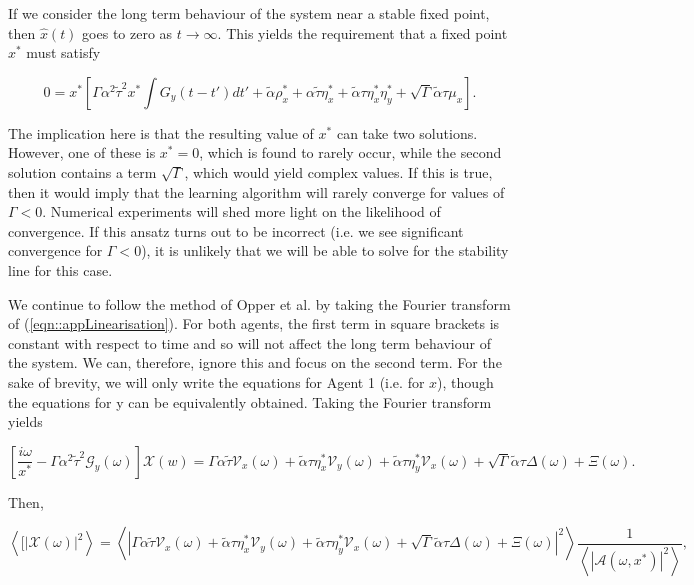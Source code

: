 \documentclass[.../main.tex]{subfiles}
\begin{document}
If we consider the long term behaviour of the system near a stable fixed point, then $\hat{x}(t)$ goes to zero as $t \rightarrow \infty$. This yields the requirement that a fixed point $x^*$ must satisfy


\begin{equation}
	0 = x^* \left[\Gamma \alpha^2 \tilde{\tau}^2 x^* \int G_y(t - t') dt' + \tilde{\alpha} \rho_x^* + \alpha \tilde{\tau} \eta_x^* + \tilde{\alpha} \tau \eta_x^* \eta_y^* + \sqrt{\Gamma} \tilde{\alpha} \tau \mu_x \right].
\end{equation}

The implication here is that the resulting value of $x^*$ can take two solutions. However, one of these is $x^* = 0$, which is found to rarely occur, while the second solution contains a term $\sqrt{\Gamma}$, which would yield complex values. If this is true, then it would imply that the learning algorithm will rarely converge for values of $\Gamma < 0$. Numerical experiments will shed more light on the likelihood of convergence. If this ansatz turns out to be incorrect (i.e. we see significant convergence for $\Gamma < 0$), it is unlikely that we will be able to solve for the stability line for this case.  

We continue to follow the method of Opper et al. by taking the Fourier transform of (\ref{eqn::appLinearisation}). For both agents, the first term in square brackets is constant with respect to time and so will not affect the long term behaviour of the system. We can, therefore, ignore this and focus on the second term. For the sake of brevity, we will only write the equations for Agent 1 (i.e. for $x$), though the equations for y can be equivalently obtained. Taking the Fourier transform yields

\begin{equation}
	\left[ \frac{i \omega}{x^*} - \Gamma \alpha^2 \tilde{\tau}^2 \mathcal{G}_y(\omega)\right] \mathcal{X}(w) = \Gamma \alpha \tilde{\tau} \mathcal{V}_x(\omega) + \tilde{\alpha} \tau \eta^*_x \mathcal{V}_y(\omega) + \tilde{\alpha} \tau \eta^*_y \mathcal{V}_x(\omega) + \sqrt{\Gamma} \tilde{\alpha} \tau \Delta(\omega) + \Xi(\omega).
\end{equation} 

Then,

\begin{equation} \label{eqn::appTransformed}
	\left<[|\mathcal{X}(\omega)|^2 \right> = \left< | \Gamma \alpha \tilde{\tau} \mathcal{V}_x(\omega) + \tilde{\alpha} \tau \eta^*_x \mathcal{V}_y(\omega) + \tilde{\alpha} \tau \eta^*_y \mathcal{V}_x(\omega) + \sqrt{\Gamma} \tilde{\alpha} \tau \Delta(\omega) + \Xi(\omega) |^2 \right> \frac{1}{\left< |\mathcal{A}(\omega, x^*) |^2 \right>}, 
\end{equation}
\end{document}
